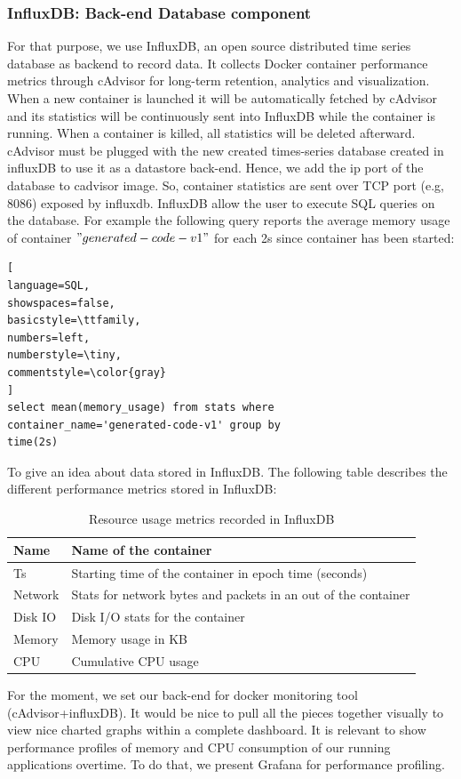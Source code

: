 \subsubsection{InfluxDB: Back-end Database component}
For that purpose, we use InfluxDB, an open source distributed time series database as backend to record data. It collects Docker container performance metrics through cAdvisor for long-term retention, analytics and visualization. When a new container is launched it will be automatically fetched by cAdvisor and its statistics will be continuously sent into InfluxDB while the container is running. When a container is killed, all statistics will be deleted afterward. cAdvisor must be plugged with the new created
times-series database created in influxDB to use it as a datastore back-end. Hence, we add the ip port of the database to cadvisor image. So, container statistics are sent over TCP port (e.g, 8086) exposed by influxdb.
InfluxDB allow the user to execute SQL queries on the database. For example the following query reports the average memory usage of container $"generated-code-v1"$ for each 2s since container has been started:

\begin{lstlisting}[
language=SQL,
showspaces=false,
basicstyle=\ttfamily,
numbers=left,
numberstyle=\tiny,
commentstyle=\color{gray}
]
select mean(memory_usage) from stats where 
container_name='generated-code-v1' group by 
time(2s)
\end{lstlisting}
To give an idea about data stored in InfluxDB. The following table describes the different performance metrics stored in InfluxDB:
 \begin{table}[h]
 	\begin{center}
 		\begin{tabular}{|p{1cm}|p{6.9cm}|}
 			\hline
 			 Name & Name of the container \\
 			\hline
 			 Ts & Starting time of the container in epoch time (seconds) \\
 			\hline
 			 Network &  Stats for network bytes and packets in an out of the container \\
 			\hline
 			 Disk IO &  Disk I/O stats for the container \\
 			\hline
 			 Memory &  Memory usage in KB \\
 			
 			\hline
 		   	CPU &  Cumulative CPU usage \\
 			\hline
 			
 		\end{tabular}
 		
 	\end{center}
 	\caption {Resource usage metrics recorded in InfluxDB}
 \end{table}
For the moment, we set our back-end for docker monitoring tool (cAdvisor+influxDB). It would be nice to pull all the pieces together visually to view nice charted graphs within a complete dashboard. It is relevant to show performance profiles of memory and CPU consumption of our running applications overtime. To do that, we present Grafana for performance profiling. 

